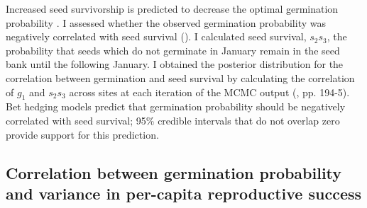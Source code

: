 \documentclass[12pt, oneside, titlepage]{article}   	%
\begin{document}
Increased seed survivorship is predicted to decrease the optimal germination probability \cite{cohen1966,ellner1985a}. I assessed whether the observed germination probability was negatively correlated with seed survival (\cite{gremer2014}). I calculated seed survival, $s_2 s_3$, the probability that seeds which do not germinate in January remain in the seed bank until the following January. I obtained the posterior distribution for the correlation between germination and seed survival by calculating the correlation of $g_1$ and $s_2 s_3$ across sites at each iteration of the MCMC output (\cite{hobbs2015b}, pp. 194-5). Bet hedging models predict that germination probability should be negatively correlated with seed survival; 95\% credible intervals that do not overlap zero provide support for this prediction.



\subsection{Correlation between germination probability and variance in per-capita reproductive success}
\end{document}
